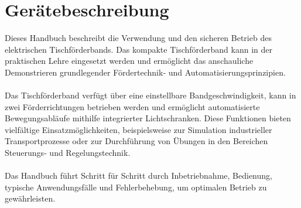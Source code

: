 %
%

\chapter{Gerätebeschreibung}
Dieses Handbuch beschreibt die Verwendung und den sicheren Betrieb des elektrischen Tischförderbands. 
Das kompakte Tischförderband kann in der praktischen Lehre eingesetzt werden und ermöglicht das anschauliche Demonstrieren grundlegender Fördertechnik‑ und Automatisierungsprinzipien.
\\\\
Das Tischförderband verfügt über eine einstellbare Bandgeschwindigkeit, kann in zwei Förderrichtungen betrieben werden und ermöglicht automatisierte Bewegungsabläufe mithilfe integrierter Lichtschranken. 
Diese Funktionen bieten vielfältige Einsatzmöglichkeiten, beispielsweise zur Simulation industrieller Transportprozesse oder zur Durchführung von Übungen in den Bereichen Steuerungs‑ und Regelungstechnik.
\\\\
Das Handbuch führt Schritt für Schritt durch Inbetriebnahme, Bedienung, typische Anwendungsfälle und Fehlerbehebung, um optimalen Betrieb zu gewährleisten.
